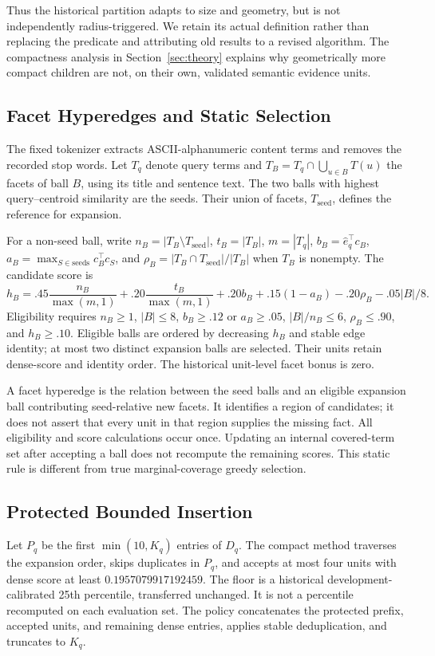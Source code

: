 \documentclass[11pt,a4paper]{article}
\begin{document}
Thus the historical partition adapts to size and geometry, but is not
independently radius-triggered. We retain its actual definition rather than
replacing the predicate and attributing old results to a revised algorithm.
The compactness analysis in Section~\ref{sec:theory} explains why geometrically
more compact children are not, on their own, validated semantic evidence units.

\subsection{Facet Hyperedges and Static Selection}
The fixed tokenizer extracts ASCII-alphanumeric content terms and removes
the recorded stop words. Let $T_q$ denote query terms and
$T_B=T_q\cap\bigcup_{u\in B}T(u)$ the facets of ball $B$, using its title and
sentence text. The two balls with highest query--centroid similarity are the
seeds. Their union of facets, $T_{\mathrm{seed}}$, defines the reference for
expansion.

For a non-seed ball, write
$n_B=|T_B\setminus T_{\mathrm{seed}}|$,
$t_B=|T_B|$, $m=|T_q|$,
$b_B=\hat e_q^\top c_B$,
$a_B=\max_{S\in\mathrm{seeds}}c_B^\top c_S$, and
$\rho_B=|T_B\cap T_{\mathrm{seed}}|/|T_B|$ when $T_B$ is nonempty.
The candidate score is
\begin{equation}
h_B=.45\frac{n_B}{\max(m,1)}+.20\frac{t_B}{\max(m,1)}
     +.20b_B+.15(1-a_B)-.20\rho_B-.05|B|/8.
\label{eq:compactscore}
\end{equation}
Eligibility requires $n_B\geq1$, $|B|\leq8$, $b_B\geq.12$ or $a_B\geq.05$,
$|B|/n_B\leq6$, $\rho_B\leq.90$, and $h_B\geq.10$.
Eligible balls are ordered by decreasing $h_B$ and stable edge identity; at
most two distinct expansion balls are selected. Their units retain dense-score
and identity order. The historical unit-level facet bonus is zero.

A facet hyperedge is the relation between the seed balls and an eligible
expansion ball contributing seed-relative new facets. It identifies a region
of candidates; it does not assert that every unit in that region supplies the
missing fact. All eligibility and score calculations occur once. Updating an
internal covered-term set after accepting a ball does not recompute the
remaining scores. This static rule is different from true marginal-coverage
greedy selection.

\subsection{Protected Bounded Insertion}
Let $P_q$ be the first $\min(10,K_q)$ entries of $D_q$. The compact method
traverses the expansion order, skips duplicates in $P_q$, and accepts at most
four units with dense score at least $0.1957079917192459$. The floor is a
historical development-calibrated 25th percentile, transferred unchanged.
It is not a percentile recomputed on each evaluation set.
The policy concatenates the protected prefix, accepted units, and remaining
dense entries, applies stable deduplication, and truncates to $K_q$.
\end{document}
